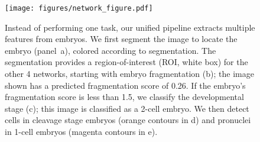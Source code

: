 
\begin{figure}[t]
\texttt{[image: figures/network\_figure.pdf]}
\caption{
    Instead of performing one task, our unified pipeline extracts
    multiple features from embryos. We first segment the image to locate
    the embryo (panel~a), colored according to segmentation. The
    segmentation provides a region-of-interest (ROI, white box) for the
    other 4 networks, starting with embryo fragmentation (b); the
    image shown has a predicted fragmentation score of 0.26. If the
    embryo's fragmentation score is less than 1.5, we classify the
    developmental stage (c); this image is classified as a 2-cell
    embryo. We then detect cells in cleavage stage embryos (orange
    contours in d) and pronuclei in 1-cell embryos (magenta contours in
    e).
}
\label{fig:network}
\end{figure}

